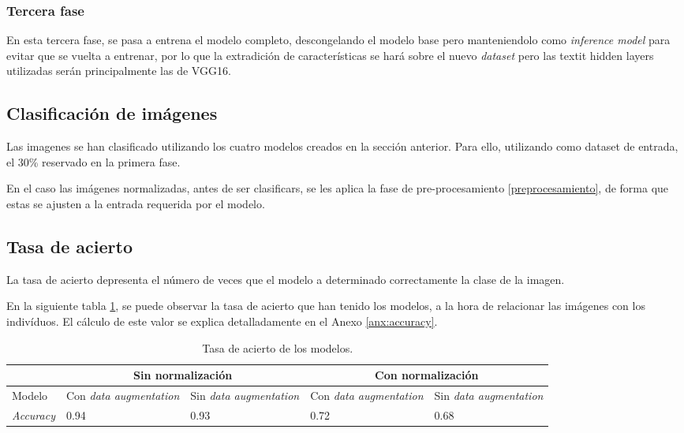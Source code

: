 \subsubsection{Tercera fase}

En esta tercera fase, se pasa a entrena el modelo completo, descongelando el modelo base pero manteniendolo como \textit{inference model} para evitar que se vuelta a entrenar,  por lo que la extradición de características se hará sobre el nuevo \textit{dataset} pero las textit {hidden layers} utilizadas serán principalmente las de VGG16.

\subsection{Clasificación de imágenes}

Las imagenes se han clasificado utilizando los cuatro modelos creados en la sección anterior. Para ello, utilizando como dataset de entrada, el 30\% reservado en la primera fase.

En el caso las imágenes normalizadas, antes de ser clasificars, se les aplica la fase de pre-procesamiento \ref{preprocesamiento}, de forma que estas se ajusten a la entrada requerida por el modelo.

\subsection{Tasa de acierto} 

La tasa de acierto depresenta el número de veces que el modelo a determinado correctamente la clase de la imagen. 

En la siguiente tabla \ref{tabla:tasa-acierto-modelos}, se puede observar la tasa de acierto que han tenido los modelos, a la hora de relacionar las imágenes
 con los indivíduos. El cálculo de este valor se explica detalladamente en el Anexo \ref{anx:accuracy}.

\begin{table}[h!]
\begin{tabular}{ |p{2cm}||p{2cm}|p{2cm}|p{2cm}|p{2cm}|  }
    \hline
     & \multicolumn{2}{|c|}{Sin normalización} & \multicolumn{2}{|c|}{Con normalización} \\
    \hline
    Modelo& Con \textit{data augmentation} & Sin \textit{data augmentation} &Con \textit{data augmentation}&Sin \textit{data augmentation}\\
    \hline
    \textit{Accuracy} & 0.94   & 0.93    & 0.72 &   0.68\\
    \hline
   \end{tabular}
   \caption{\label{tabla:tasa-acierto-modelos}Tasa de acierto de los modelos.}
\end{table}


